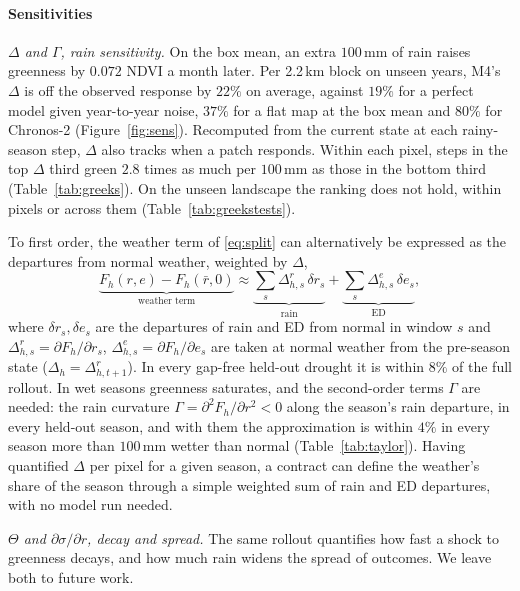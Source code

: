 \documentclass[letterpaper]{article} %
\begin{document}
\paragraph{Sensitivities}

\textit{$\Delta$ and $\Gamma$, rain sensitivity.} On the box mean, an extra $100$\,mm of rain raises greenness by $0.072$ NDVI a month later. Per 2.2\,km block on unseen years, M4's $\Delta$ is off the observed response by $22\%$ on average, against $19\%$ for a perfect model given year-to-year noise, $37\%$ for a flat map at the box mean and $80\%$ for Chronos-2 (Figure~\ref{fig:sens}). Recomputed from the current state at each rainy-season step, $\Delta$ also tracks when a patch responds. Within each pixel, steps in the top $\Delta$ third green $2.8$ times as much per $100$\,mm as those in the bottom third (Table~\ref{tab:greeks}). On the unseen landscape the ranking does not hold, within pixels or across them (Table~\ref{tab:greekstests}).

To first order, the weather term of \eqref{eq:split} can alternatively be expressed as the departures from normal weather, weighted by $\Delta$,
\begin{equation}
\underbrace{F_h(r,e)-F_h(\bar r,0)}_{\text{weather term}}\approx\underbrace{\textstyle\sum_s \Delta^{r}_{h,s}\,\delta r_s}_{\text{rain}}+\underbrace{\textstyle\sum_s \Delta^{e}_{h,s}\,\delta e_s}_{\text{ED}},
\label{eq:taylor}
\end{equation}
where $\delta r_s,\delta e_s$ are the departures of rain and ED from normal in window $s$ and $\Delta^r_{h,s}=\partial F_h/\partial r_s$, $\Delta^e_{h,s}=\partial F_h/\partial e_s$ are taken at normal weather from the pre-season state ($\Delta_h=\Delta^r_{h,t+1}$). In every gap-free held-out drought it is within $8\%$ of the full rollout. In wet seasons greenness saturates, and the second-order terms $\Gamma$ are needed: the rain curvature $\Gamma=\partial^2F_h/\partial r^2<0$ along the season's rain departure, in every held-out season, and with them the approximation is within $4\%$ in every season more than $100$\,mm wetter than normal (Table~\ref{tab:taylor}). Having quantified $\Delta$ per pixel for a given season, a contract can define the weather's share of the season through a simple weighted sum of rain and ED departures, with no model run needed.

\textit{$\Theta$ and $\partial\sigma/\partial r$, decay and spread.} The same rollout quantifies how fast a shock to greenness decays, and how much rain widens the spread of outcomes. We leave both to future work.
\end{document}

